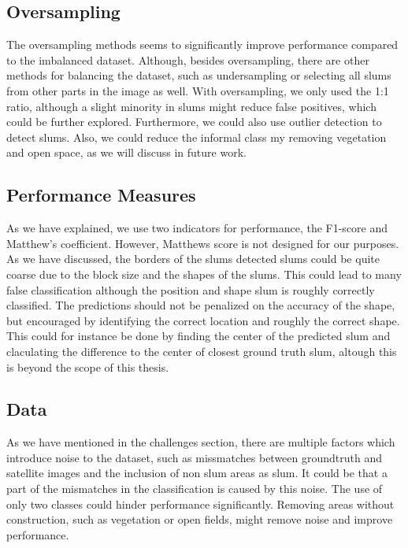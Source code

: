 \subsection{Oversampling}
The oversampling methods seems to significantly improve performance compared to the imbalanced dataset. Although, besides oversampling, there are other methods for balancing the dataset, such as undersampling or selecting all slums from other parts in the image as well. With oversampling, we only used the 1:1 ratio, although a slight minority in slums might reduce false positives, which could be further explored. Furthermore, we could also use outlier detection to detect slums. Also, we could reduce the informal class my removing vegetation and open space, as we will discuss in future work.

\subsection{Performance Measures}
As we have explained, we use two indicators for performance, the F1-score and Matthew's coefficient. However, Matthews score is not designed for our purposes. As we have discussed, the borders of the slums detected slums could be quite coarse due to the block size and the shapes of the slums. This could lead to many false classification although the position and shape slum is roughly correctly classified. The predictions should not be penalized on the accuracy of the shape, but encouraged by identifying the correct location and roughly the correct shape. This could for instance be done by finding the center of the predicted slum and claculating the difference to the center of closest ground truth slum, altough this is beyond the scope of this thesis.

\subsection{Data}
As we have mentioned in the challenges section, there are multiple factors which introduce noise to the dataset, such as missmatches between groundtruth and satellite images and the inclusion of non slum areas as slum. It could be that a part of the mismatches in the classification is caused by this noise. The use of only two classes could hinder performance significantly. Removing areas without construction, such as vegetation or open fields, might remove noise and improve performance.






